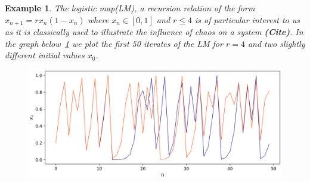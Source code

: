 \documentclass[a4paper,12pt,twoside]{report}
\newtheorem{Example}{Example}[]
\begin{document}
\begin{Example} \rm
  The logistic map(LM), a recursion relation of the form $x_{n+1}=rx_n(1-x_n)$ where $x_n\in[0,1]$ and $r\leq{4}$ is of particular interest to us as it is classically used to illustrate the influence of chaos on a system \textbf{(Cite)}. 
  In the graph below~\ref{fig:log_sdic} we plot the first 50 iterates of the LM for $r=4$ and two slightly different initial values $x_0$.

  \begin{figure}[ht]
    \includegraphics[scale=0.74]{_logistic_sdic.eps}
        \centering
        \label{fig:log_sdic}
      \end{figure}
\end{Example}
\end{document}
